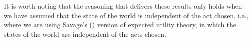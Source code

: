 \documentclass[a4paper]{article}
\newcommand{\D}{\mathcal{D}}
\newcommand{\todoold}[2][]{\todo[backgroundcolor=white,bordercolor=orange!10,linecolor=gray!10, #1,caption={},textcolor=gray]{Pre-rev: #2}}
\newcommand{\todooldinfo}[2][]{\todoold[#1]{#2}}
\newenvironment{CCM rewritten}
{\begingroup\color{blue}} %
{\endgroup}              %
\begin{document}
It is worth noting that the reasoning that delivers these results only holds when we have assumed that the state of the world is independent of the act chosen, i.e., where we are using Savage's (\citeyear{savage1954fs}) version of expected utility theory, in which the states of the world are independent of the acts chosen. %


\end{document}
